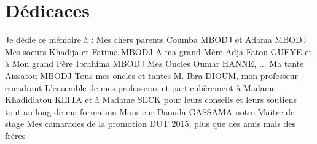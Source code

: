 %
%

\chapter*{Dédicaces}
Je dédie ce mémoire à :
Mes chers parents Coumba MBODJ et Adama MBODJ
Mes soeurs Khadija et Fatima MBODJ
A ma grand-Mère Adja Fatou GUEYE et à Mon grand Père Ibrahima MBODJ
Mes Oncles Oumar HANNE, ...
Ma tante Aissatou MBODJ
Tous mes oncles et tantes
M. Ibra DIOUM, mon professeur encadrant
L’ensemble de mes professeurs et particulièrement à Madame Khadidiatou KEITA et à Madame SECK pour leurs conseils et leurs soutiens tout au long de ma formation
Monsieur Daouda GASSAMA notre Maitre de stage
Mes camarades de la promotion DUT 2015, plus que des amis mais des frères
\clearpage